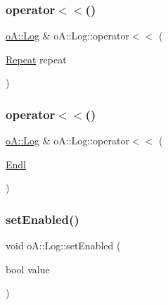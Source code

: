\mbox{\label{classo_a_1_1_log_af5330fde11ac127dba6a6091e5e12b69}} 
\subsubsection{\texorpdfstring{operator$<$$<$()}{operator<<()}\hspace{0.1cm}{\footnotesize\ttfamily [8/9]}}
{\footnotesize\ttfamily \mbox{\hyperlink{classo_a_1_1_log}{o\+A\+::\+Log}} \& o\+A\+::\+Log\+::operator$<$$<$ (\begin{DoxyParamCaption}\item[{\mbox{\hyperlink{classo_a_1_1_repeat}{Repeat}}}]{repeat }\end{DoxyParamCaption})}

\mbox{\label{classo_a_1_1_log_ace93b1b2eda01f9b9a0c81bc8b23083d}} 
\subsubsection{\texorpdfstring{operator$<$$<$()}{operator<<()}\hspace{0.1cm}{\footnotesize\ttfamily [9/9]}}
{\footnotesize\ttfamily \mbox{\hyperlink{classo_a_1_1_log}{o\+A\+::\+Log}} \& o\+A\+::\+Log\+::operator$<$$<$ (\begin{DoxyParamCaption}\item[{\mbox{\hyperlink{classo_a_1_1_endl}{Endl}}}]{ }\end{DoxyParamCaption})}

\mbox{\label{classo_a_1_1_log_a7c4699ea7ad0c8b910b4a3fc57ba5afe}} 
\subsubsection{\texorpdfstring{set\+Enabled()}{setEnabled()}}
{\footnotesize\ttfamily void o\+A\+::\+Log\+::set\+Enabled (\begin{DoxyParamCaption}\item[{bool}]{value }\end{DoxyParamCaption})\hspace{0.3cm}{\ttfamily [noexcept]}}


